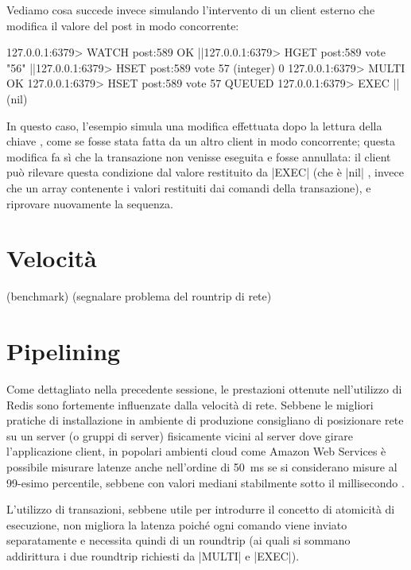 Vediamo cosa succede invece simulando l'intervento di un client esterno che modifica il valore
del post in modo concorrente:

\begin{commentedsource}[style=redis]
127.0.0.1:6379> WATCH post:589
OK
|\lnote|127.0.0.1:6379> HGET post:589 vote
"56"
|\lnote|127.0.0.1:6379> HSET post:589 vote 57
(integer) 0
127.0.0.1:6379> MULTI
OK
127.0.0.1:6379> HSET post:589 vote 57
QUEUED
127.0.0.1:6379> EXEC
|\lnote|(nil)
\end{commentedsource}

In questo caso, l'esempio simula una modifica  effettuata dopo la lettura della chiave
, come se fosse stata fatta da un altro client in modo concorrente; questa modifica fa sì
che la transazione non venisse eseguita e fosse annullata: il client può rilevare questa condizione
dal valore restituito da \cverb|EXEC| (che è \cverb|nil| , invece che un array contenente i
valori restituiti dai comandi della transazione), e riprovare nuovamente la sequenza.

\section{Velocità}

(benchmark)
(segnalare problema del rountrip di rete)


\section{Pipelining}

Come dettagliato nella precedente sessione, le prestazioni ottenute nell'utilizzo di Redis sono
fortemente influenzate dalla velocità di rete. Sebbene le migliori pratiche di installazione in
ambiente di produzione consigliano di posizionare rete su un server (o gruppi di server) fisicamente
vicini al server dove girare l'applicazione client, in popolari ambienti cloud come Amazon Web
Services è possibile misurare latenze anche nell'ordine di \SI{50}{\milli\second} se si considerano
misure al 99-esimo percentile, sebbene con valori mediani stabilmente sotto il millisecondo
\cite{aws-latency}.

L'utilizzo di transazioni, sebbene utile per introdurre il concetto di atomicità di esecuzione,
non migliora la latenza poiché ogni comando viene inviato separatamente e necessita quindi di un 
roundtrip (ai quali si sommano addirittura i due roundtrip richiesti da \cverb|MULTI| e \cverb|EXEC|).

